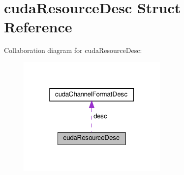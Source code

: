\hypertarget{structcudaResourceDesc}{}\section{cuda\+Resource\+Desc Struct Reference}
\label{structcudaResourceDesc}


Collaboration diagram for cuda\+Resource\+Desc\+:\nopagebreak
\begin{figure}[H]
\begin{center}
\leavevmode
\includegraphics[width=208pt]{structcudaResourceDesc__coll__graph}
\end{center}
\end{figure}

